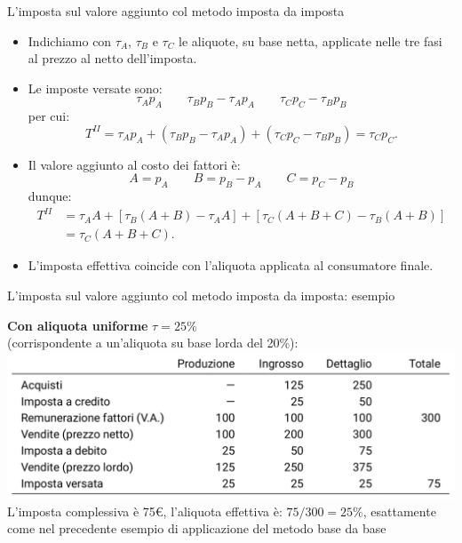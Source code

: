\documentclass[aspectratio=149,11pt,italian]{beamer}
\begin{document}
\begin{frame}{L'imposta sul valore aggiunto col metodo imposta da imposta}
\begin{itemize}
\item Indichiamo con $\tau_A$, $\tau_B$ e $\tau_C$ le aliquote, su base netta,
applicate nelle tre fasi al prezzo al netto dell'imposta.
\item Le imposte versate sono:
\begin{equation*}
\tau_Ap_A \qquad \tau_Bp_B-\tau_Ap_A \qquad \tau_Cp_C-\tau_Bp_B
\end{equation*}
per cui:
\begin{equation*}
  T^{II}=\tau_Ap_A + (\tau_Bp_B-\tau_Ap_A) +
  (\tau_C p_C-\tau_Bp_B)=\tau_Cp_C.
\end{equation*}
\item Il valore aggiunto al costo dei fattori è:
\begin{equation*}
A=p_A \qquad B = p_B-p_A \qquad C=p_C-p_B
\end{equation*}
dunque:
\begin{equation*}
\begin{split}
  T^{II}&=\tau_AA + [\tau_B(A+B)-\tau_AA] + [\tau_C(A+B+C)-\tau_B(A+B)]\\
  &=\tau_C(A+B+C).
\end{split}
\end{equation*}
\item L'imposta effettiva coincide con l'aliquota applicata al consumatore finale.
\end{itemize}
\end{frame}

\begin{frame}{L'imposta sul valore aggiunto col metodo imposta da imposta: esempio}
\begin{block}{}
\textbf{Con aliquota uniforme} $\tau=25\%$\\(corrispondente a un'aliquota su base
lorda del 20\%):\\
\includegraphics[width=\textwidth]{./figure/esempio-imposta-da-imposta-1.png}\\
L'imposta complessiva è 75€, l'aliquota effettiva è: $75/300=25\%$,
esattamente come nel precedente esempio di applicazione del metodo base da
base
\end{block}
\end{frame}
\end{document}
